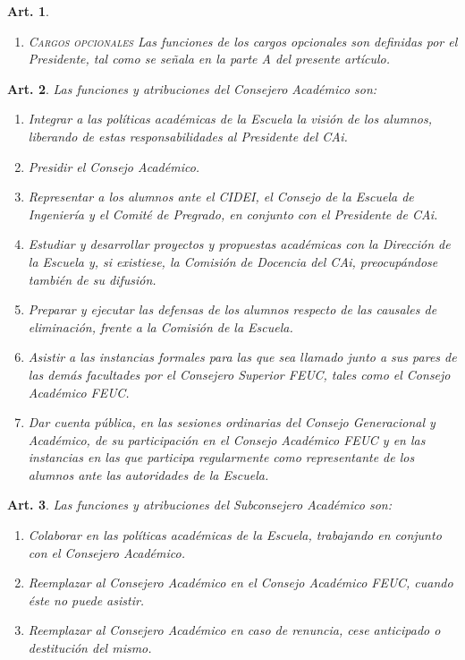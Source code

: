 \documentclass[letterpaper,11pt]{article}
\theoremstyle{plain}
\newtheorem{art}{Art.} %
\begin{document}
\begin{art}
\begin{enumerate}
				\item \textsc{Cargos opcionales}
					Las funciones de los cargos opcionales son definidas por el Presidente, tal como se señala en la parte A del presente artículo. 
			\end{enumerate}
		\end{art}

		\begin{art}\label{funcionesCAPregrado}
			Las funciones y atribuciones del Consejero Académico son:
			\begin{enumerate}
				\item Integrar a las políticas académicas de la Escuela la visión de los alumnos, liberando de estas responsabilidades al Presidente del CAi.
				\item Presidir el Consejo Académico.
				\item Representar a los alumnos ante el \emph{CIDEI}, el Consejo de la Escuela de Ingeniería y el Comité de Pregrado, en conjunto con el Presidente de CAi.
				\item Estudiar y desarrollar proyectos y propuestas académicas con la Dirección de la Escuela y, si existiese, la Comisión de Docencia del CAi, preocupándose también de su difusión.
				\item Preparar y ejecutar las defensas de los alumnos respecto de las causales de eliminación, frente a la Comisión de la Escuela.
				\item Asistir a las instancias formales para las que sea llamado junto a sus pares de las demás facultades por el Consejero Superior FEUC, tales como el Consejo Académico FEUC.
				\item Dar cuenta pública, en las sesiones ordinarias del Consejo Generacional y Académico, de su participación en el Consejo Académico FEUC y en las instancias en las que participa regularmente como representante de los alumnos ante las autoridades de la Escuela.
			\end{enumerate}
		\end{art}

		\begin{art}
			Las funciones y atribuciones del Subconsejero Académico son:
			\begin{enumerate}
				\item Colaborar en las políticas académicas de la Escuela, trabajando en conjunto con el Consejero Académico.
				\item Reemplazar al Consejero Académico en el Consejo Académico FEUC, cuando éste no puede asistir.
				\item Reemplazar al Consejero Académico en caso de renuncia, cese anticipado o destitución del mismo.
			\end{enumerate}
		\end{art}
\end{document}

